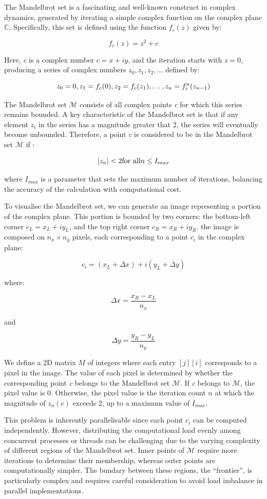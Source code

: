 \documentclass[
]{article}
\begin{document}
The Mandelbrot set is a fascinating and well-known construct in complex
dynamics, generated by iterating a simple complex function on the
complex plane \(\mathbb{C}\). Specifically, this set is defined using
the function \(f_c(z)\) given by:

\[f_c(z) = z^2 + c\]

Here, \emph{c} is a complex number \(c = x + iy\), and the iteration
starts with \(z = 0\), producing a series of complex numbers
\(z_0, z_1, z_2, ...\) defined by:

\[z_0 = 0, z_1 = f_c(0), z_2 = f_c(z_1), \space \dots \space , z_n = f_c^n(z_{n-1})\]

The Mandelbrot set \(\mathcal{M}\) consists of all complex points
\emph{c} for which this series remains bounded. A key characteristic of
the Mandelbrot set is that if any element \(z_i\) in the series has a
magnitude greater that 2, the series will eventually become unbounded.
Therefore, a point \emph{c} is considered to be in the Mandelbrot set
\(\mathcal{M}\) if :

\[|z_n| < 2 \space \text{for all} \space n \leq I_{max}\]

where \(I_{max}\) is a parameter that sets the maximum number of
iterations, balancing the accuracy of the calculation with computational
cost.

To visualise the Mandelbrot set, we can generate an image representing a
portion of the complex plane. This portion is bounded by two corners:
the bottom-left corner \(c_L = x_L + iy_L\), and the top right corner
\(c_R = x_R + iy_R\). the image is composed on \(n_x \times n_y\)
pixels, each corresponding to a point \(c_i\) in the complex plane:

\[c_i = (x_L + \Delta x) + i(y_L + \Delta y)\]

where:

\[\Delta x = \frac{x_R - x_L}{n_x}\]

and

\[\Delta y = \frac{y_R - y_L}{n_y}\]

We define a 2D matrix \(M\) of integers where each entry \([j][i]\)
corresponds to a pixel in the image. The value of each pixel is
determined by whether the corresponding point \emph{c} belongs to the
Mandelbrot set \(\mathcal{M}\). If \emph{c} belongs to \(\mathcal{M}\),
the pixel value is 0. Otherwise, the pixel value is the iteration count
\(n\) at which the magnitude of \(z_n(c)\) exceeds 2, up to a maximum
value of \(I_{max}\).

This problem is inherently parallelisable since each point \(c_i\) can
be computed independently. However, distributing the computational load
evenly among concurrent processes or threads can be challenging due to
the varying complexity of different regions of the Mandelbrot set. Inner
points of \(\mathcal{M}\) require more iterations to determine their
membership, whereas outer points are computationally simpler. The
bundary between these regions, the ``frontier'', is particularly complex
and requires careful consideration to avoid load imbalance in parallel
implementations.
\end{document}

